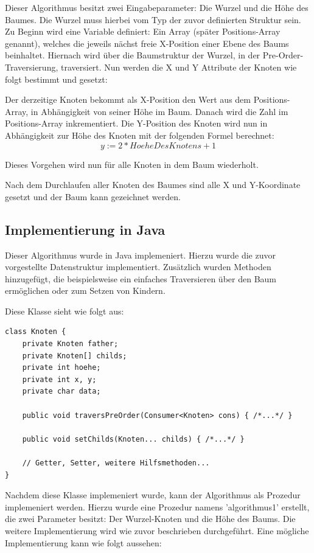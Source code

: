 Dieser Algorithmus besitzt zwei Eingabeparameter: Die Wurzel und die Höhe des Baumes.
Die Wurzel muss hierbei vom Typ der zuvor definierten Struktur sein. Zu Beginn wird eine Variable definiert:
Ein Array (später Positions-Array genannt), welches die jeweils nächst freie X-Position einer Ebene des Baums beinhaltet.
Hiernach wird über die Baumstruktur der Wurzel, in der Pre-Order-Traversierung, traversiert.
Nun werden die X und Y Attribute der Knoten wie folgt bestimmt und gesetzt:

Der derzeitige Knoten bekommt als X-Position den Wert aus dem Positions-Array, in Abhängigkeit von seiner Höhe im Baum.
Danach wird die Zahl im Positions-Array inkrementiert. Die Y-Position des Knoten wird nun in Abhängigkeit zur Höhe des Knoten
mit der folgenden Formel berechnet: $$y := 2 * HoeheDesKnotens + 1$$

Dieses Vorgehen wird nun für alle Knoten in dem Baum wiederholt. 

Nach dem Durchlaufen aller Knoten des Baumes sind alle X und Y-Koordinate gesetzt und der Baum kann gezeichnet werden.

\subsection{Implementierung in Java}
Dieser Algorithmus wurde in Java implemeniert. Hierzu wurde die zuvor vorgestellte Datenstruktur
implementiert. Zusätzlich wurden Methoden hinzugefügt, die beispielsweise
ein einfaches Traversieren über den Baum ermöglichen oder zum Setzen von Kindern.

Diese Klasse sieht wie folgt aus:

\begin{lstlisting}[caption=Vereinfachte Implementierung der Knotenklasse, label=code:knotenclass]
class Knoten {
	private Knoten father;
	private Knoten[] childs;
	private int hoehe;
	private int x, y;
	private char data;

	public void traversPreOrder(Consumer<Knoten> cons) { /*...*/ }

	public void setChilds(Knoten... childs) { /*...*/ }

	// Getter, Setter, weitere Hilfsmethoden...
}
\end{lstlisting}

Nachdem diese Klasse implemeniert wurde, kann der Algorithmus als Prozedur implemeniert werden.
Hierzu wurde eine Prozedur namens 'algorithmus1' erstellt, die zwei Parameter besitzt: Der Wurzel-Knoten
und die Höhe des Baums. Die weitere Implementierung wird wie zuvor beschrieben durchgeführt. Eine mögliche Implementierung
kann wie folgt aussehen:

